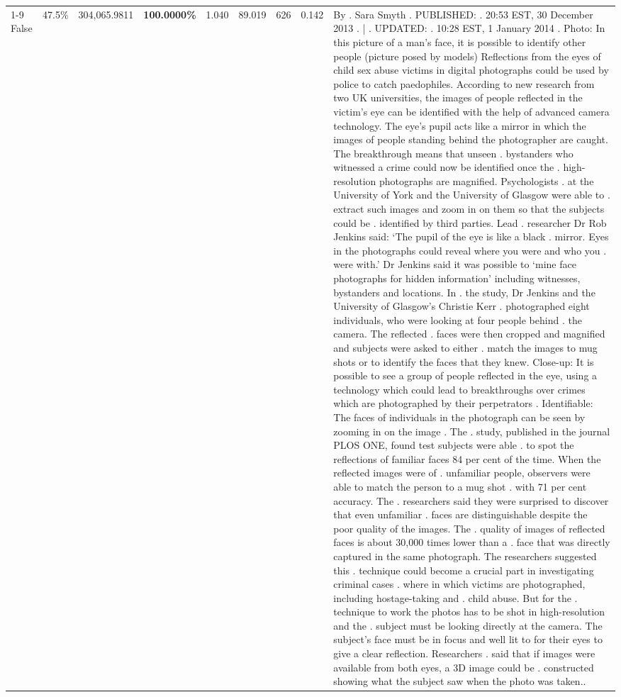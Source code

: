 \begin{table}[H]
\begin{tabular}{lllrlllll}
\cline{1-9} \cline{2-9}
False & 47.5\% & 304,065.9811 & \bfseries \color{red} 100.0000\% & 1.040 & 89.019 & 626 & 0.142 & By . Sara Smyth . PUBLISHED: . 20:53 EST, 30 December 2013 . | . UPDATED: . 10:28 EST, 1 January 2014 . Photo: In this picture of a man's face, it is possible to identify other people (picture posed by models) Reflections from the eyes of child sex abuse victims in digital photographs could be used by police to catch paedophiles. According to new research from two UK universities, the images of people reflected in the victim's eye can be identified with the help of advanced camera technology. The eye's pupil acts like a mirror in which the images of people standing behind the photographer are caught. The breakthrough means that unseen . bystanders who witnessed a crime could now be identified once the . high-resolution photographs are magnified. Psychologists . at the University of York and the University of Glasgow were able to . extract such images and zoom in on them so that the subjects could be . identified by third parties. Lead . researcher Dr Rob Jenkins said: ‘The pupil of the eye is like a black . mirror. Eyes in the photographs could reveal where you were and who you . were with.' Dr Jenkins said it was possible to ‘mine face photographs for hidden information' including witnesses, bystanders and locations. In . the study, Dr Jenkins and the University of Glasgow's Christie Kerr . photographed eight individuals, who were looking at four people behind . the camera. The reflected . faces were then cropped and magnified and subjects were asked to either . match the images to mug shots or to identify the faces that they knew. Close-up: It is possible to see a group of people reflected in the eye, using a technology which could lead to breakthroughs over crimes which are photographed by their perpetrators . Identifiable: The faces of individuals in the photograph can be seen by zooming in on the image . The . study, published in the journal PLOS ONE, found test subjects were able . to spot the reflections of familiar faces 84 per cent of the time. When the reflected images were of . unfamiliar people, observers were able to match the person to a mug shot . with 71 per cent accuracy. The . researchers said they were surprised to discover that even unfamiliar . faces are distinguishable despite the poor quality of the images. The . quality of images of reflected faces is about 30,000 times lower than a . face that was directly captured in the same photograph. The researchers suggested this . technique could become a crucial part in investigating criminal cases . where in which victims are photographed, including hostage-taking and . child abuse. But for the . technique to work the photos has to be shot in high-resolution and the . subject must be looking directly at the camera. The subject's face must be in focus and well lit to for their eyes to give a clear reflection. Researchers . said that if images were available from both eyes, a 3D image could be . constructed showing what the subject saw when the photo was taken.. \\

\end{tabular}
\end{table}
